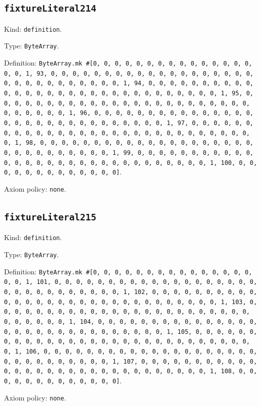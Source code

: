 \documentclass[11pt]{article}
\begin{document}
\subsection*{\texttt{fixtureLiteral214}}
\noindent Kind: \texttt{definition}.\par
\noindent Type: \texttt{ByteArray}.\par
\noindent Definition: \texttt{ByteArray.mk \#[0, 0, 0, 0, 0, 0, 0, 0, 0, 0, 0, 0, 0, 0, 0, 0, 0, 1, 93, 0, 0, 0, 0, 0, 0, 0, 0, 0, 0, 0, 0, 0, 0, 0, 0, 0, 0, 0, 0, 0, 0, 0, 0, 0, 0, 0, 0, 0, 0, 1, 94, 0, 0, 0, 0, 0, 0, 0, 0, 0, 0, 0, 0, 0, 0, 0, 0, 0, 0, 0, 0, 0, 0, 0, 0, 0, 0, 0, 0, 0, 0, 1, 95, 0, 0, 0, 0, 0, 0, 0, 0, 0, 0, 0, 0, 0, 0, 0, 0, 0, 0, 0, 0, 0, 0, 0, 0, 0, 0, 0, 0, 0, 0, 1, 96, 0, 0, 0, 0, 0, 0, 0, 0, 0, 0, 0, 0, 0, 0, 0, 0, 0, 0, 0, 0, 0, 0, 0, 0, 0, 0, 0, 0, 0, 0, 1, 97, 0, 0, 0, 0, 0, 0, 0, 0, 0, 0, 0, 0, 0, 0, 0, 0, 0, 0, 0, 0, 0, 0, 0, 0, 0, 0, 0, 0, 0, 0, 1, 98, 0, 0, 0, 0, 0, 0, 0, 0, 0, 0, 0, 0, 0, 0, 0, 0, 0, 0, 0, 0, 0, 0, 0, 0, 0, 0, 0, 0, 0, 0, 1, 99, 0, 0, 0, 0, 0, 0, 0, 0, 0, 0, 0, 0, 0, 0, 0, 0, 0, 0, 0, 0, 0, 0, 0, 0, 0, 0, 0, 0, 0, 0, 1, 100, 0, 0, 0, 0, 0, 0, 0, 0, 0, 0, 0, 0, 0]}.\par
\noindent Axiom policy: \texttt{none}.\par
\subsection*{\texttt{fixtureLiteral215}}
\noindent Kind: \texttt{definition}.\par
\noindent Type: \texttt{ByteArray}.\par
\noindent Definition: \texttt{ByteArray.mk \#[0, 0, 0, 0, 0, 0, 0, 0, 0, 0, 0, 0, 0, 0, 0, 0, 0, 1, 101, 0, 0, 0, 0, 0, 0, 0, 0, 0, 0, 0, 0, 0, 0, 0, 0, 0, 0, 0, 0, 0, 0, 0, 0, 0, 0, 0, 0, 0, 0, 1, 102, 0, 0, 0, 0, 0, 0, 0, 0, 0, 0, 0, 0, 0, 0, 0, 0, 0, 0, 0, 0, 0, 0, 0, 0, 0, 0, 0, 0, 0, 0, 1, 103, 0, 0, 0, 0, 0, 0, 0, 0, 0, 0, 0, 0, 0, 0, 0, 0, 0, 0, 0, 0, 0, 0, 0, 0, 0, 0, 0, 0, 0, 0, 1, 104, 0, 0, 0, 0, 0, 0, 0, 0, 0, 0, 0, 0, 0, 0, 0, 0, 0, 0, 0, 0, 0, 0, 0, 0, 0, 0, 0, 0, 0, 0, 1, 105, 0, 0, 0, 0, 0, 0, 0, 0, 0, 0, 0, 0, 0, 0, 0, 0, 0, 0, 0, 0, 0, 0, 0, 0, 0, 0, 0, 0, 0, 0, 1, 106, 0, 0, 0, 0, 0, 0, 0, 0, 0, 0, 0, 0, 0, 0, 0, 0, 0, 0, 0, 0, 0, 0, 0, 0, 0, 0, 0, 0, 0, 0, 1, 107, 0, 0, 0, 0, 0, 0, 0, 0, 0, 0, 0, 0, 0, 0, 0, 0, 0, 0, 0, 0, 0, 0, 0, 0, 0, 0, 0, 0, 0, 0, 1, 108, 0, 0, 0, 0, 0, 0, 0, 0, 0, 0, 0, 0, 0]}.\par
\noindent Axiom policy: \texttt{none}.\par
\end{document}
